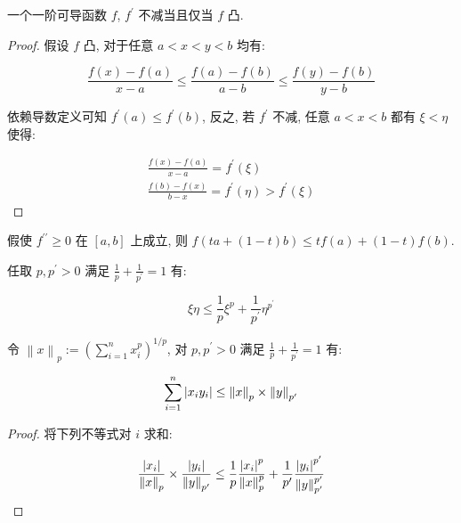 \begin{lemma}
    一个一阶可导函数 \(f\), \(f^\prime\) 不减当且仅当 \(f\) 凸.

    \begin{proof}
        假设 \(f\) 凸, 对于任意 \(a < x < y < b\) 均有:

        \[
            \frac{f(x) - f(a)}{x - a} \leq \frac{f(a) - f(b)}{a - b} \leq \frac{f(y) - f(b)}{y - b}
        \]

        依赖导数定义可知 \(f^\prime (a) \leq f^\prime (b)\), 反之, 若 \(f^\prime\) 不减, 任意 \(a < x < b\) 都有 \(\xi < \eta\) 使得:

        \[
            \begin{aligned}
                \frac{f(x) - f(a)}{x - a} = f^\prime (\xi) \\
                \frac{f(b) - f(x)}{b - x} = f^\prime (\eta) > f^\prime (\xi)
            \end{aligned}
        \]
    \end{proof}
\end{lemma}

\begin{corollary}[Jensen]
    假使 \(f^{\prime \prime} \geq 0\) 在 \([a,b]\) 上成立, 则 \(f(ta + (1-t)b) \leq tf(a) + (1-t)f(b)\).
\end{corollary}

\begin{corollary}[Young]
    任取 \(p,p^\prime > 0\) 满足 \(\frac{1}{p} + \frac{1}{p^\prime} = 1\) 有:
    
    \[
        \xi \eta \leq \frac{1}{p} \xi^p + \frac{1}{p^\prime} \eta^{p^\prime}
    \]
\end{corollary}

\begin{corollary}[Hölder]
    令 \(\left\|x\right\|_p := {(\sum_{i=1}^{n} x_i^p)}^{1/p}\), 对 \(p,p^\prime > 0\) 满足 \(\frac{1}{p} + \frac{1}{p^\prime} = 1\) 有:

    \[
        \sum_{i=1}^{n} \abs {x_i y_i} \leq \left\|x\right\|_p \times \left\|y\right\|_{p^\prime}
    \]

    \begin{proof}
        将下列不等式对 \(i\) 求和:

        \[
            \frac{\abs{x_i}}{\left\|x\right\|_p} \times \frac{\abs{y_i}}{\left\|y\right\|_{p^\prime}} \leq \frac{1}{p} \frac{\abs{x_i}^p}{\left\|x\right\|_p^p} + \frac{1}{p^\prime} \frac{\abs{y_i}^{p^\prime}}{\left\|y\right\|_{p^\prime}^{p^\prime}}
        \]
    \end{proof}
\end{corollary}

